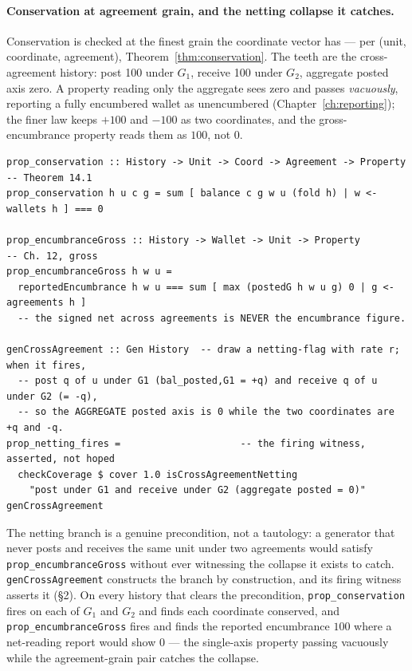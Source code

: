 \documentclass[11pt,a4paper]{article}
\begin{document}
\paragraph{Conservation at agreement grain, and the netting collapse it catches.}
Conservation is checked at the finest grain the coordinate vector has --- per (unit,
coordinate, agreement), Theorem~\ref{thm:conservation}. The teeth are the cross-agreement
history: post 100 under $G_1$, receive 100 under $G_2$, aggregate posted axis zero. A
property reading only the aggregate sees zero and passes \emph{vacuously}, reporting a
fully encumbered wallet as unencumbered (Chapter~\ref{ch:reporting}); the finer law keeps
$+100$ and $-100$ as two coordinates, and the gross-encumbrance property reads them as
$100$, not $0$.

\begin{lstlisting}
prop_conservation :: History -> Unit -> Coord -> Agreement -> Property  -- Theorem 14.1
prop_conservation h u c g = sum [ balance c g w u (fold h) | w <- wallets h ] === 0

prop_encumbranceGross :: History -> Wallet -> Unit -> Property          -- Ch. 12, gross
prop_encumbranceGross h w u =
  reportedEncumbrance h w u === sum [ max (postedG h w u g) 0 | g <- agreements h ]
  -- the signed net across agreements is NEVER the encumbrance figure.

genCrossAgreement :: Gen History  -- draw a netting-flag with rate r; when it fires,
  -- post q of u under G1 (bal_posted,G1 = +q) and receive q of u under G2 (= -q),
  -- so the AGGREGATE posted axis is 0 while the two coordinates are +q and -q.
prop_netting_fires =                     -- the firing witness, asserted, not hoped
  checkCoverage $ cover 1.0 isCrossAgreementNetting
    "post under G1 and receive under G2 (aggregate posted = 0)" genCrossAgreement
\end{lstlisting}

The netting branch is a genuine precondition, not a tautology: a generator that never posts
and receives the same unit under two agreements would satisfy \texttt{prop\_encumbranceGross}
without ever witnessing the collapse it exists to catch. \texttt{genCrossAgreement} constructs
the branch by construction, and its firing witness asserts it (\S 2). On every history that
clears the precondition, \texttt{prop\_conservation} fires on each of $G_1$ and $G_2$ and
finds each coordinate conserved, and \texttt{prop\_encumbranceGross} fires and finds the
reported encumbrance $100$ where a net-reading report would show $0$ --- the single-axis
property passing vacuously while the agreement-grain pair catches the collapse.
\end{document}

